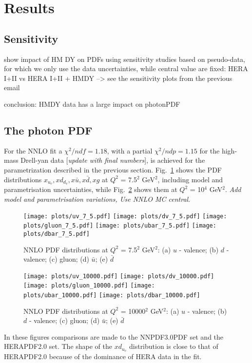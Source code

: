 \section{Results}
\label{sec:results}

\subsection{Sensitivity}
 show impact of HM DY on PDFs using sensitivity studies based on
pseudo-data, for which we only use the data uncertainties, while central 
value are fixed:
 HERA I+II vs HERA I+II + HMDY --> see the sensitivity plots from the previous email

conclusion: HMDY data has a large impact on photonPDF 

\subsection{The photon PDF}

For the NNLO fit a $\chi^{2}/ndf = 1.18$, with a partial $\chi^2/ndp = 1.15$ for the high-mass Drell-yan data [{\it update with final numbers}], is achieved for the
parametrization described in the previous section.
%
Fig.~\ref{PDF_7.5GeV}
 shows the PDF distributions $x_{u_v},xd_{d_v},x\bar{u}, x\bar{d}, xg$ at $Q^{2}$ = 7.5$^{2}$ GeV$^{2}$,
including model and parametrisation uncertainties, while  Fig.~\ref{PDF_10000GeV} 
shows them at $Q^{2}$ = 10$^{4}$ GeV$^{2}$. {\it Add model and parametrisation variations, Use NNLO MC central}.
\begin{figure}
\texttt{[image: plots/uv\_7\_5.pdf]} 
\texttt{[image: plots/dv\_7\_5.pdf]} 
\texttt{[image: plots/gluon\_7\_5.pdf]} 
\texttt{[image: plots/ubar\_7\_5.pdf]} 
\texttt{[image: plots/dbar\_7\_5.pdf]} 
\caption{NNLO PDF distributions at $Q^{2}$ = 7.5$^{2}$ GeV$^{2}$: (a) $u$ - valence; (b) $d$ - valence; (c) gluon; (d) $\bar{u}$; (e) $\bar{d}$ }
\label{PDF_7.5GeV}
\end{figure}
\begin{figure}
\texttt{[image: plots/uv\_10000.pdf]} 
\texttt{[image: plots/dv\_10000.pdf]} 
\texttt{[image: plots/gluon\_10000.pdf]} 
\texttt{[image: plots/ubar\_10000.pdf]} 
\texttt{[image: plots/dbar\_10000.pdf]} 
\caption{NNLO PDF distributions at $Q^{2}$ = 10000$^{2}$ GeV$^{2}$: (a) $u$ - valence; (b) $d$ - valence; (c) gluon; (d) $\bar{u}$; (e) $\bar{d}$}
\label{PDF_10000GeV}
\end{figure}
In these figures comparisons are made to the NNPDF3.0PDF set and the HERAPDF2.0 set.
The shape of the $xd_{u_v}$ distribution is close to that of HERAPDF2.0 
because of the dominance of HERA data in the fit. 


